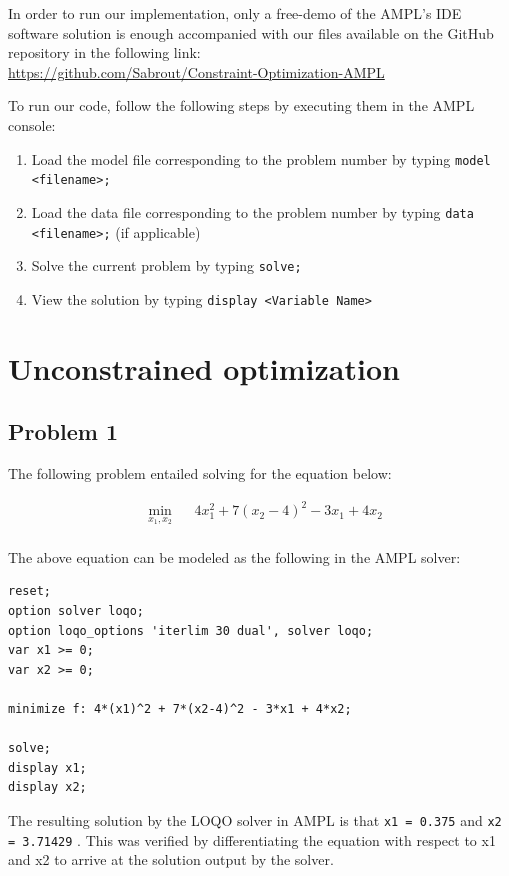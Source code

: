 In order to run our implementation, only a free-demo of the AMPL's IDE software solution is enough accompanied with our files available on the GitHub repository in the following link: \\
\url{https://github.com/Sabrout/Constraint-Optimization-AMPL}

To run our code, follow the following steps by executing them in the AMPL console:
\begin{enumerate}
	\item Load the model file corresponding to the problem number by typing \texttt{model <filename>;}
	\item Load the data file corresponding to the problem number by typing  \texttt{data <filename>;} (if applicable)
	\item Solve the current problem by typing \texttt{solve;}
	\item View the solution by typing \texttt{display <Variable Name>}
\end{enumerate}

\section{Unconstrained optimization}
\subsection{Problem 1}
The following problem entailed solving for the equation below:

\begin{equation*}
\begin{aligned}
& \underset{x_1,x_2}{\text{min}}
& & 4x_1^2 + 7(x_2 - 4)^2 - 3x_1 + 4x_2 \\ 
\end{aligned}
\end{equation*}

The above equation can be modeled as the following in the AMPL solver:

\begin{verbatim}
reset;
option solver loqo;
option loqo_options 'iterlim 30 dual', solver loqo;
var x1 >= 0;
var x2 >= 0;

minimize f: 4*(x1)^2 + 7*(x2-4)^2 - 3*x1 + 4*x2;

solve;
display x1;
display x2;
\end{verbatim}

The resulting solution by the LOQO solver in AMPL is that \texttt{x1 = 0.375} and \texttt{x2 = 3.71429} . This was verified by differentiating the equation with respect to x1 and x2 to arrive at the solution output by the solver.


